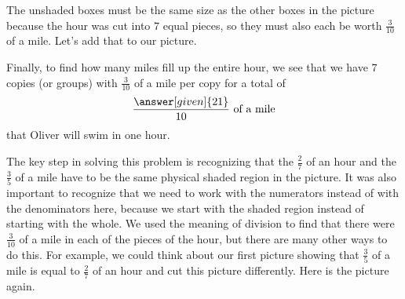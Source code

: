 \documentclass{ximera}
\begin{document}
\begin{example}
\begin{image}
\end{image}
The unshaded boxes must be the same size as the other boxes in the picture because the hour was cut into $7$ equal pieces, so they must also each be worth $\frac{3}{10}$ of a mile. Let's add that to our picture.
\begin{image}
\end{image}
Finally, to find how many miles fill up the entire hour, we see that we have $7$ copies (or groups) with $\frac{3}{10}$ of a mile per copy for a total of 
\[
\frac{\answer[given]{21}}{10} \textrm{ of a mile}
\]
that Oliver will swim in one hour.
\end{example}



The key step in solving this problem is recognizing that the $\frac{2}{7}$ of an hour and the $\frac{3}{5}$ of a mile have to be the same physical shaded region in the picture. It was also important to recognize that we need to work with the numerators instead of with the denominators here, because we start with the shaded region instead of starting with the whole. We used the meaning of division to find that there were $\frac{3}{10}$ of a mile in each of the pieces of the hour, but there are many other ways to do this. For example, we could think about our first picture showing that $\frac{3}{5}$ of a mile is equal to $\frac{2}{7}$ of an hour and cut this picture differently. Here is the picture again. 
\end{document}
